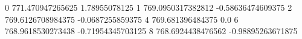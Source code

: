 0 771.470947265625 1.78955078125
1 769.0950317382812 -0.58636474609375
2 769.6126708984375 -0.0687255859375
4 769.681396484375 0.0
6 768.9618530273438 -0.71954345703125
8 768.6924438476562 -0.98895263671875
